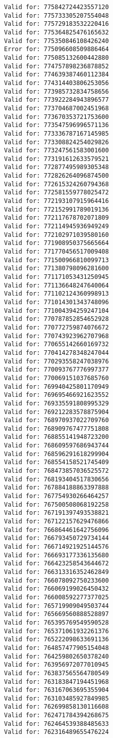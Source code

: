 \documentclass[11pt]{article}
\begin{document}
\begin{Verbatim}[commandchars=\\\{\}]
Valid for: 775842724423557120
Valid for: 775733305207554048
Valid for: 775729183532220416
Valid for: 775364825476165632
Valid for: 775350846108426240
Error for: 775096608509886464
Valid for: 775085132600442880
Valid for: 774757898236878852
Valid for: 774639387460112384
Valid for: 774314403806253056
Valid for: 773985732834758656
Valid for: 773922284943896577
Valid for: 773704687002451968
Valid for: 773670353721753600
Valid for: 773547596996571136
Valid for: 773336787167145985
Valid for: 773308824254029826
Valid for: 773247561583001600
Valid for: 773191612633579521
Valid for: 772877495989305348
Valid for: 772826264096874500
Valid for: 772615324260794368
Valid for: 772581559778025472
Valid for: 772193107915964416
Valid for: 772152991789019136
Valid for: 772117678702071809
Valid for: 772114945936949249
Valid for: 772102971039580160
Valid for: 771908950375665664
Valid for: 771770456517009408
Valid for: 771500966810099713
Valid for: 771380798096281600
Valid for: 771171053431250945
Valid for: 771136648247640064
Valid for: 771102124360998913
Valid for: 771014301343748096
Valid for: 771004394259247104
Valid for: 770787852854652928
Valid for: 770772759874076672
Valid for: 770743923962707968
Valid for: 770655142660169732
Valid for: 770414278348247044
Valid for: 770293558247038976
Valid for: 770093767776997377
Valid for: 770069151037685760
Valid for: 769940425801170949
Valid for: 769695466921623552
Valid for: 769335591808995329
Valid for: 769212283578875904
Valid for: 768970937022709760
Valid for: 768909767477751808
Valid for: 768855141948723200
Valid for: 768609597686943744
Valid for: 768596291618299904
Valid for: 768554158521745409
Valid for: 768473857036525572
Valid for: 768193404517830656
Valid for: 767884188863397888
Valid for: 767754930266464257
Valid for: 767500508068192258
Valid for: 767191397493538821
Valid for: 767122157629476866
Valid for: 766864461642756096
Valid for: 766793450729734144
Valid for: 766714921925144576
Valid for: 766693177336135680
Valid for: 766423258543644672
Valid for: 766313316352462849
Valid for: 766078092750233600
Valid for: 766069199026450432
Valid for: 766008592277377025
Valid for: 765719909049503744
Valid for: 765669560888528897
Valid for: 765395769549590528
Valid for: 765371061932261376
Valid for: 765222098633691136
Valid for: 764857477905154048
Valid for: 764259802650378240
Valid for: 763956972077010945
Valid for: 763837565564780549
Valid for: 763183847194451968
Valid for: 763167063695355904
Valid for: 763103485927849985
Valid for: 762699858130116608
Valid for: 762471784394268675
Valid for: 762464539388485633
Valid for: 762316489655476224

\end{Verbatim}
\end{document}
